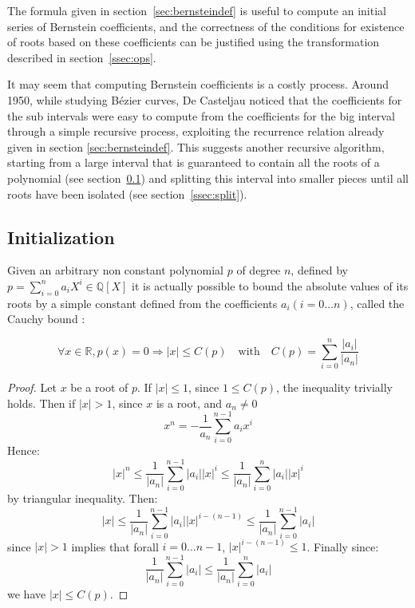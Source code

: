 \documentclass{mscs}
\begin{document}
The formula given in section~\ref{sec:bernsteindef} is useful to compute an
initial series of Bernstein coefficients, and the correctness of the
conditions for existence of roots based on these coefficients can be
justified using the transformation described in
section~\ref{ssec:ops}.

It may seem that computing Bernstein coefficients is a costly process.
Around 1950, while studying B\'ezier curves, De Casteljau noticed that
the coefficients for the sub intervals
were easy to compute from the coefficients for the big interval
through a simple recursive process, exploiting the recurrence relation
already given in section \ref{sec:bernsteindef}.  This suggests
another recursive algorithm, starting from a large interval that is
guaranteed to contain all the roots of a polynomial (see section~\ref{ssec:cauchy}) and splitting this
interval into smaller pieces until all roots have been isolated (see section~\ref{ssec:split}).

\subsection{Initialization}\label{ssec:cauchy}
Given an arbitrary non constant polynomial $p$ of degree
$n$, defined by $p = \sum_{i  = 0}^n a_iX^i \in
\mathbb{Q}[X]$ it is actually  possible to bound the absolute values
of its roots by a simple constant defined from the coefficients
$a_i ({i = 0 \dots n})$, called the Cauchy bound \cite{bpr}:
\begin{theorem}
$$\forall x \in \mathbb{R}, p(x) = 0 \Rightarrow |x|
\leq C(p) \quad \textrm{with} \quad C(p) = \sum_{i=0}^n \frac{|a_i|}{|a_n|}$$
\end{theorem}
\begin{proof}
Let $x$ be a root of $p$. If $|x|\leq 1$, since $1 \leq C(p)$,
the inequality trivially holds. Then if $|x| > 1$, since $x$ is a root,
and $a_n \neq 0$
$$x^n = - \frac{1}{a_n}\sum_{i = 0}^{n-1}a_i x^i$$
Hence:
$$|x|^n \leq \frac{1}{|a_n|}\sum_{i = 0}^{n-1}|a_i| |x|^i \leq
\frac{1}{|a_n|}\sum_{i = 0}^{n}|a_i| |x|^i$$
by triangular inequality. Then:
$$|x| \leq \frac{1}{|a_n|}\sum_{i = 0}^{n-1}|a_i| |x|^{i - (n - 1)} \leq
\frac{1}{|a_n|}\sum_{i = 0}^{n-1}|a_i| $$
since $|x| > 1$ implies that forall $i = 0 \dots n-1$,
$|x|^{i - (n - 1)} \leq 1$. Finally since:
$$\frac{1}{|a_n|}\sum_{i = 0}^{n-1}|a_i| \leq \frac{1}{|a_n|}\sum_{i =
  0}^{n}|a_i|$$
we have $|x| \leq C(p)$.
\end{proof}

\end{document}
